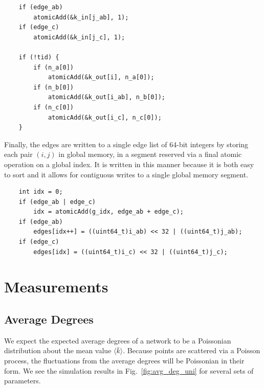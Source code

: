 \documentclass[preprint,notitlepage,amsmath,amssymb,floatfix]{revtex4-1}
\begin{document}
\begin{lstlisting}
	if (edge_ab)
		atomicAdd(&k_in[j_ab], 1);
	if (edge_c)
		atomicAdd(&k_in[j_c], 1);

	if (!tid) {
		if (n_a[0])
			atomicAdd(&k_out[i], n_a[0]);
		if (n_b[0])
			atomicAdd(&k_out[i_ab], n_b[0]);
		if (n_c[0])
			atomicAdd(&k_out[i_c], n_c[0]);
	}
\end{lstlisting}

\noindent Finally, the edges are written to a single edge list of 64-bit integers by storing each pair $(i,j)$ in global memory, in a segment reserved via a final atomic operation on a global index.  
It is written in this manner because it is both easy to sort and it allows for contiguous writes to a single global memory segment.

\begin{lstlisting}
	int idx = 0;
	if (edge_ab | edge_c)
		idx = atomicAdd(g_idx, edge_ab + edge_c);
	if (edge_ab)
		edges[idx++] = ((uint64_t)i_ab) << 32 | ((uint64_t)j_ab);
	if (edge_c)
		edges[idx] = ((uint64_t)i_c) << 32 | ((uint64_t)j_c);
\end{lstlisting}

\section{Measurements}
\subsection{Average Degrees}
We expect the expected average degrees of a network to be a Poissonian distribution about the mean value $\langle\bar{k}\rangle$.  
Because points are scattered via a Poisson process, the fluctuations from the average degrees will be Poissonian in their form.
We see the simulation results in Fig.~\ref{fig:avg_deg_uni} for several sets of parameters.
\end{document}
